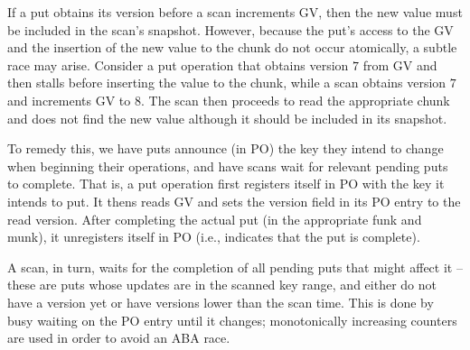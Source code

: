 If a put obtains its version before a scan increments GV, then the new value must be included in the scan's snapshot. 
However, because the put's access to the GV and the insertion of the new value to the chunk do not occur atomically,
a subtle race may arise. Consider a put operation that obtains version $7$ from GV and then stalls before
inserting the value to the chunk, while a scan obtains version $7$ and increments GV to $8$. The scan then proceeds 
to read the appropriate chunk and does not find the new value although it should be included in its snapshot.

To remedy this, we have puts announce (in PO) the key they intend to change when beginning their operations, and have scans wait for relevant pending puts to complete. That is,
a put operation first registers itself in PO with the key it intends to put.
It thens reads GV and sets the version field in its PO entry to the read version. 
After completing the actual put (in the appropriate funk and munk), it unregisters itself in PO (i.e., 
indicates that the put is complete).

A scan, in turn, 
waits for the completion of all pending puts  that might affect it  -- these are puts whose updates 
are in the scanned key range, and either do not have a version yet or have versions lower than the scan time.
This is done by busy waiting on the PO entry until it changes; monotonically increasing counters are used 
in order to avoid an  ABA race. 





